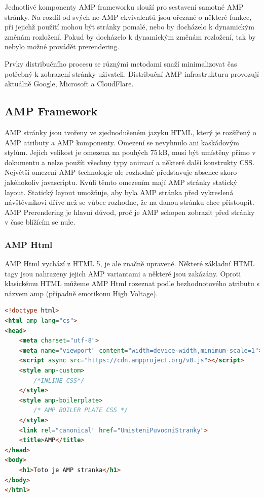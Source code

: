 Jednotlivé komponenty AMP frameworku slouží pro sestavení samotné AMP stránky. Na rozdíl od svých
ne-AMP ekvivalentů jsou ořezané o některé funkce, při jejichž použití mohou být stránky pomalé, nebo
by docházelo k dynamickým změnám rozložení. Pokud by docházelo k dynamickým změnám rozložení,
tak by nebylo možné provádět prerendering.


Prvky distribučního procesu se různými metodami snaží minimalizovat čas potřebný k zobrazení stránky
uživateli. Distribuční AMP infrastrukturu provozují aktuálně Google, Microsoft a CloudFlare\cite[Ch.\ 1, p.\ 49]{VzhuruDoAMP}.

\subsection*{AMP Framework}
AMP stránky jsou tvořeny ve zjednodušeném jazyku HTML, který je rozšířený o AMP atributy a AMP
komponenty. Omezení se nevyhnulo ani kaskádovým stylům. Jejich velikost je omezena na pouhých
75\,kB, musí být umístěny přímo v dokumentu a nelze použít všechny typy animací a některé další
konstrukty CSS.
Největší omezení AMP technologie ale rozhodně představuje absence skoro jakéhokoliv javascriptu.
Kvůli těmto omezením mají AMP stránky statický layout. Statický layout umožňuje, aby byla AMP stránka před vykreslená návštěvníkovi dříve než se vůbec rozhodne, že na danou stránku chce přistoupit. AMP Prerendering je hlavní důvod, proč je AMP schopen zobrazit před stránky v čase blížícím se nule\cite{AMP-zero}.
\subsubsection*{AMP Html}
AMP Html vychází z HTML 5, je ale značně upravené. Některé základní HTML tagy jsou nahrazeny jejich AMP variantami a některé jsou zakázány.
Oproti klasickému HTML můžeme AMP Html rozeznat podle bezhodnotového atributu s názvem amp (případně emotikonu High Voltage).

\begin{lstlisting}[language=html, caption=Ukázka AMP Html,captionpos=t]
<!doctype html>
<html amp lang="cs">
<head>
    <meta charset="utf-8">
    <meta name="viewport" content="width=device-width,minimum-scale=1">
    <script async src="https://cdn.ampproject.org/v0.js"></script>
    <style amp-custom>
        /*INLINE CSS*/
    </style>
    <style amp-boilerplate>
        /* AMP BOILER PLATE CSS */
    </style>
    <link rel="canonical" href="UmisteniPuvodniStranky">
    <title>AMP</title>
</head>
<body>
    <h1>Toto je AMP stranka</h1>
</body>
</html>

\end{lstlisting}

